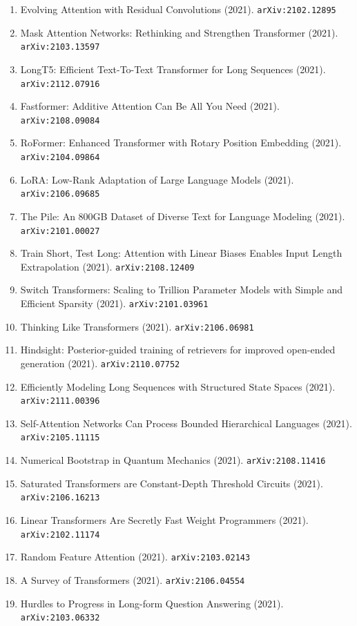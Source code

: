 \documentclass[11pt]{article}
\begin{document}
\begin{enumerate}
  \item Evolving Attention with Residual Convolutions (2021). \texttt{arXiv:2102.12895}
  \item Mask Attention Networks: Rethinking and Strengthen Transformer (2021). \texttt{arXiv:2103.13597}
  \item LongT5: Efficient Text-To-Text Transformer for Long Sequences (2021). \texttt{arXiv:2112.07916}
  \item Fastformer: Additive Attention Can Be All You Need (2021). \texttt{arXiv:2108.09084}
  \item RoFormer: Enhanced Transformer with Rotary Position Embedding (2021). \texttt{arXiv:2104.09864}
  \item LoRA: Low-Rank Adaptation of Large Language Models (2021). \texttt{arXiv:2106.09685}
  \item The Pile: An 800GB Dataset of Diverse Text for Language Modeling (2021). \texttt{arXiv:2101.00027}
  \item Train Short, Test Long: Attention with Linear Biases Enables Input
  Length Extrapolation (2021). \texttt{arXiv:2108.12409}
  \item Switch Transformers: Scaling to Trillion Parameter Models with Simple
  and Efficient Sparsity (2021). \texttt{arXiv:2101.03961}
  \item Thinking Like Transformers (2021). \texttt{arXiv:2106.06981}
  \item Hindsight: Posterior-guided training of retrievers for improved
  open-ended generation (2021). \texttt{arXiv:2110.07752}
  \item Efficiently Modeling Long Sequences with Structured State Spaces (2021). \texttt{arXiv:2111.00396}
  \item Self-Attention Networks Can Process Bounded Hierarchical Languages (2021). \texttt{arXiv:2105.11115}
  \item Numerical Bootstrap in Quantum Mechanics (2021). \texttt{arXiv:2108.11416}
  \item Saturated Transformers are Constant-Depth Threshold Circuits (2021). \texttt{arXiv:2106.16213}
  \item Linear Transformers Are Secretly Fast Weight Programmers (2021). \texttt{arXiv:2102.11174}
  \item Random Feature Attention (2021). \texttt{arXiv:2103.02143}
  \item A Survey of Transformers (2021). \texttt{arXiv:2106.04554}
  \item Hurdles to Progress in Long-form Question Answering (2021). \texttt{arXiv:2103.06332}

\end{enumerate}
\end{document}
